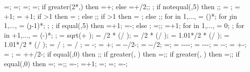 {{\bottomlined=\bottomlined;
\bottomlinet=\bottomlinet;
\bottomxvalue=\bottomxvalue;
\bottomyvalue=\bottomyvalue;
if greater(2*\massrad,\collinet) then {
\latloadshift=\latloadshift+\massrad;} else {
\latloadshift=\latloadshift+\collinet/2;};
;
%
if notequal(\showsupports,5) then {;};
%
\storyminone = ;
\columnnumber = \baynumber+1; %
\levelnumber = \storynumber+1; %
if \storynumber>1 then {\nlevmo = ;} else {;};
if \baynumber>1 then {\ncolmo = ;} else {;};
for \iii in {1,...,{\levelnumber}}{
\y{\iii} = ()*\storyheight;
for \j in {1,...,{\columnnumber}}{
\x{\j} = (\j-1)*\baywidth;
};
};
if equal(\showsupports,5) then
{=\subfloors+1;
\superstorynumber=\storynumber-\subfloors;}
else
{;
\superstorynumber=\storynumber;};
=+1;
for \idefl in {1,...,{}}{
	 = 0;
};
for \idefl in {+1,...,{\levelnumber}}{
	 = (\idefl-)*\drift*\showdefl;
};
\tempdim = sqrt( + );
\fixbeamx = \collinet/2 * ( / \tempdim);
\fixbeamy = \collinet/2 * ( / \tempdim);
\fixcoly = 1.01*\beamlinet/2 * ( / \tempdim);
\fixcolx = 1.01*\beamlinet/2 * ( / \tempdim);
 =  / \storyheight * \baywidth;
 =  / \storyheight * \baywidth;
\rigbasestartx = -\supportwidth;
\rigbaseendx = \x{\columnnumber}+\supportwidth;
\isoboty = -\supportheight-\baselinet/2-\isolationdepth;
\isotopy = -\supportheight-\baselinet/2;
\isodeflx=\isodeflratio*\isolationdepth*\showdefl;
\foundboty = -\supportheight-\baselinet-\isolationdepth-\foundationdepth;
\foundtopy = -\supportheight-\baselinet-\isolationdepth;
\foundstartx = -\foundsidew-\isodeflx;
\foundendx = \x{\columnnumber}+\foundsidew-\isodeflx;
\structheight= \storynumber*\storyheight;
\isomidy = \supportheight+\isolinet+\isolationdepth/2-\baselinet;
if equal(\subfloors,0) then {;};
if greater(\leftstory, \subfloors) then {\leftstory=\subfloors;};
if greater(\rightstory, \subfloors) then {\rightstory=\subfloors;};
if equal(\showopenstory,0) then
{\leftstory=\subfloors;
\rightstory=\subfloors;};
\leftopenstory=\subfloors-\leftstory;
\leftlevel=\leftstory+1;
\leftwallh=\leftstory*\storyheight;
\leftopenh=\leftopenstory*\storyheight;
\rightopenstory=\subfloors-\rightstory;
}}
